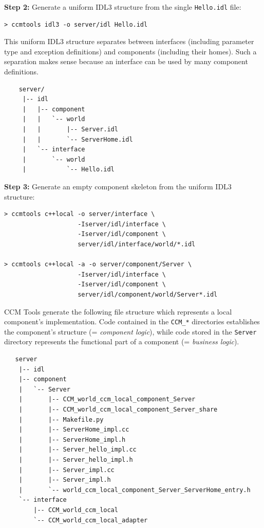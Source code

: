 \noindent
{\bf Step 2:} Generate a uniform IDL3 structure from the single {\tt Hello.idl}
file:
\begin{small}
\begin{verbatim}
> ccmtools idl3 -o server/idl Hello.idl
\end{verbatim}
\end{small}

\noindent
This uniform IDL3 structure separates between interfaces (including 
parameter type and exception definitions) and components (including their
homes). Such a separation makes sense because an interface can be used by
many component definitions.
\begin{small}
\begin{verbatim}
    server/
     |-- idl
     |   |-- component
     |   |   `-- world
     |   |       |-- Server.idl
     |   |       `-- ServerHome.idl
     |   `-- interface
     |       `-- world
     |           `-- Hello.idl
\end{verbatim}
\end{small}


\noindent
{\bf Step 3:} Generate an empty component skeleton from the uniform IDL3 
structure:
\begin{small}
\begin{verbatim}
> ccmtools c++local -o server/interface \
                    -Iserver/idl/interface \
                    -Iserver/idl/component \
                    server/idl/interface/world/*.idl

> ccmtools c++local -a -o server/component/Server \ 
                    -Iserver/idl/interface \
                    -Iserver/idl/component \
                    server/idl/component/world/Server*.idl  
\end{verbatim}
\end{small}

\noindent
CCM Tools generate the following file structure which represents a local
component's implementation.
Code contained in the {\tt CCM\_*} directories establishes the component's
structure (= {\it component logic}), while code stored in the {\tt Server} 
directory represents the functional part of a component (= {\it business
logic}).

\begin{small}
\begin{verbatim}
   server
    |-- idl
    |-- component
    |   `-- Server
    |       |-- CCM_world_ccm_local_component_Server
    |       |-- CCM_world_ccm_local_component_Server_share
    |       |-- Makefile.py
    |       |-- ServerHome_impl.cc
    |       |-- ServerHome_impl.h
    |       |-- Server_hello_impl.cc
    |       |-- Server_hello_impl.h
    |       |-- Server_impl.cc
    |       |-- Server_impl.h
    |       `-- world_ccm_local_component_Server_ServerHome_entry.h
    `-- interface
        |-- CCM_world_ccm_local
        `-- CCM_world_ccm_local_adapter
\end{verbatim}
\end{small}

